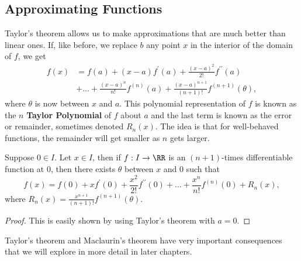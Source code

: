 \documentclass[../real_analysis.tex]{subfiles}
\begin{document}
        \subsection{Approximating Functions}\label{subsec:approximating-functions}
            Taylor's theorem allows us to make approximations that are much better than linear ones. If, like before, we replace $b$ any point $x$ in the interior of the domain of $f$, we get
            \begin{align}
                f(x)&=f(a)+(x-a)f^\prime(a)+\frac{(x-a)^2}{2!}f^{\prime\prime}(a)\\
                &+\dots+\frac{(x-
                a)^n}{n!}f^{(n)}(a)+\frac{(x-a)^{n+1}}{(n+1)!}f^{(n+1)}(\theta),
            \end{align}
            where $\theta$ is now between $x$ and $a$. This polynomial representation of $f$ is known as the $n$ \textbf{Taylor Polynomial} of $f$ about $a$ and the last term is known as the error or remainder, sometimes denoted $R_n(x)$. The idea is that for well-behaved functions, the remainder will get smaller as $n$ gets larger.
            \begin{corollary}
                Suppose $0\in I$. Let $x\in I$, then if $f:I\to\RR$ is an $(n+1)$-times differentiable function at 0, then there exists $\theta$ between $x$ and 0 such that
                \begin{equation}
                    f(x)=f(0)+xf^\prime(0)+\frac{x^2}{2!}f^{\prime\prime}(0)+\dots+\frac{x^n}{n!}f^{(n)}(0)+R_n(x),
                \end{equation}
                where $R_n(x)=\frac{x^{n+1}}{(n+1)!}f^{(n+1)}(\theta)$.
            \end{corollary}
            \begin{proof}
                This is easily shown by using Taylor's theorem with $a=0$.
            \end{proof}
            Taylor's theorem and Maclaurin's theorem have very important consequences that we will explore in more detail in later chapters.
\end{document}
